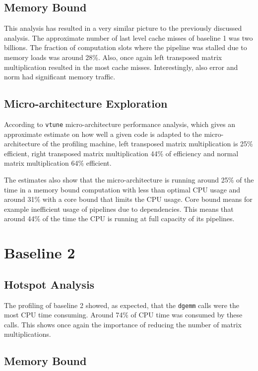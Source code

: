\documentclass[11pt]{article}
\begin{document}
\subsection*{Memory Bound}

This analysis has resulted in a very similar picture to the previously discussed analysis. The approximate number of last level cache misses of baseline 1 was two billions. The fraction of computation slots where the pipeline was stalled due to memory loads was around 28\%. Also, once again left transposed matrix multiplication resulted in the most cache misses. Interestingly, also error and norm had significant memory traffic. 

\subsection*{Micro-architecture Exploration}

According to \texttt{vtune} micro-architecture performance analysis, which gives an approximate estimate on how well a given code is adapted to the micro-architecture of the profiling machine, left transposed matrix multiplication is 25\% efficient, right transposed matrix multiplication 44\% of efficiency and normal matrix multiplication 64\% efficient. 

The estimates also show that the micro-architecture is running around 25\% of the time in a memory bound computation with less than optimal CPU usage and around 31\% with a core bound that limits the CPU usage. Core bound means for example inefficient usage of pipelines due to dependencies. This means that around 44\% of the time the CPU is running at full capacity of its pipelines.

\section*{Baseline 2}

\subsection*{Hotspot Analysis}

The profiling of baseline 2 showed, as expected, that the \texttt{dgemm} calls were the most CPU time consuming. Around 74\% of CPU time was consumed by these calls. This shows once again the importance of reducing the number of matrix multiplications.

\subsection*{Memory Bound}
\end{document}

